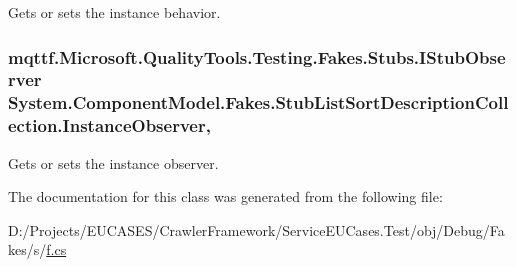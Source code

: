 Gets or sets the instance behavior.

\hypertarget{class_system_1_1_component_model_1_1_fakes_1_1_stub_list_sort_description_collection_a2f50a9e2de197d8f74ec071a773508f5}{
\subsubsection[{Instance\-Observer}]{\setlength{\rightskip}{0pt plus 5cm}mqttf.\-Microsoft.\-Quality\-Tools.\-Testing.\-Fakes.\-Stubs.\-I\-Stub\-Observer System.\-Component\-Model.\-Fakes.\-Stub\-List\-Sort\-Description\-Collection.\-Instance\-Observer\hspace{0.3cm}{\ttfamily [get]}, {\ttfamily [set]}}}\label{class_system_1_1_component_model_1_1_fakes_1_1_stub_list_sort_description_collection_a2f50a9e2de197d8f74ec071a773508f5}


Gets or sets the instance observer.



The documentation for this class was generated from the following file\-:\begin{DoxyCompactItemize}
\item 
D\-:/\-Projects/\-E\-U\-C\-A\-S\-E\-S/\-Crawler\-Framework/\-Service\-E\-U\-Cases.\-Test/obj/\-Debug/\-Fakes/s/\hyperlink{s_2f_8cs}{f.\-cs}\end{DoxyCompactItemize}
